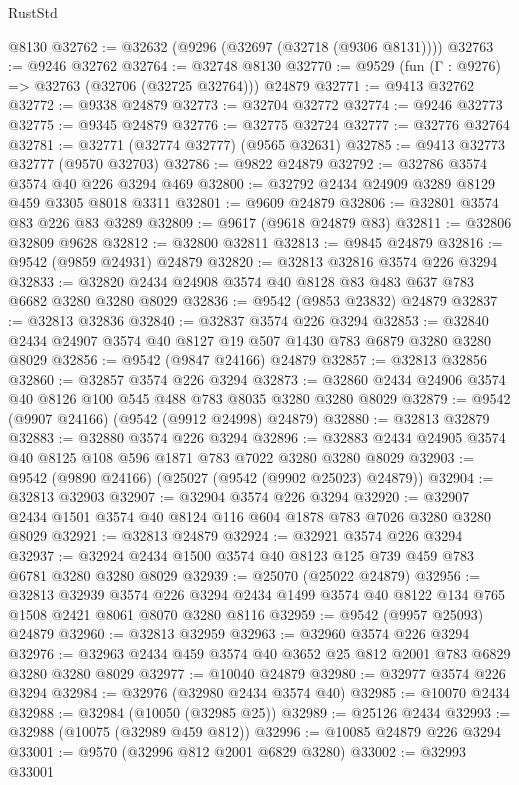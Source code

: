 \begin{lexlean}{RustStd}
\begin{coremodule}
    @8130
@32762 := @32632 (@9296 (@32697 (@32718 (@9306 @8131))))
@32763 := @9246 @32762
@32764 := @32748 @8130
@32770 := @9529 (fun (Γ : @9276) => @32763 (@32706 (@32725 @32764))) @24879
@32771 := @9413 @32762
@32772 := @9338 @24879
@32773 := @32704 @32772
@32774 := @9246 @32773
@32775 := @9345 @24879
@32776 := @32775 @32724
@32777 := @32776 @32764
@32781 := @32771 (@32774 @32777) (@9565 @32631)
@32785 := @9413 @32773 @32777 (@9570 @32703)
@32786 := @9822 @24879
@32792 := @32786 @3574 @3574 @40 @226 @3294 @469
@32800 := @32792 @2434 @24909 @3289 @8129 @459 @3305 @8018 @3311
@32801 := @9609 @24879
@32806 := @32801 @3574 @83 @226 @83 @3289
@32809 := @9617 (@9618 @24879 @83)
@32811 := @32806 @32809 @9628
@32812 := @32800 @32811
@32813 := @9845 @24879
@32816 := @9542 (@9859 @24931) @24879
@32820 := @32813 @32816 @3574 @226 @3294
@32833 := @32820 @2434 @24908 @3574 @40 @8128 @83 @483 @637 @783 @6682 @3280 @3280 @8029
@32836 := @9542 (@9853 @23832) @24879
@32837 := @32813 @32836
@32840 := @32837 @3574 @226 @3294
@32853 := @32840 @2434 @24907 @3574 @40 @8127 @19 @507 @1430 @783 @6879 @3280 @3280 @8029
@32856 := @9542 (@9847 @24166) @24879
@32857 := @32813 @32856
@32860 := @32857 @3574 @226 @3294
@32873 := @32860 @2434 @24906 @3574 @40 @8126 @100 @545 @488 @783 @8035 @3280 @3280 @8029
@32879 := @9542 (@9907 @24166) (@9542 (@9912 @24998) @24879)
@32880 := @32813 @32879
@32883 := @32880 @3574 @226 @3294
@32896 := @32883 @2434 @24905 @3574 @40 @8125 @108 @596 @1871 @783 @7022 @3280 @3280 @8029
@32903 := @9542 (@9890 @24166) (@25027 (@9542 (@9902 @25023) @24879))
@32904 := @32813 @32903
@32907 := @32904 @3574 @226 @3294
@32920 := @32907 @2434 @1501 @3574 @40 @8124 @116 @604 @1878 @783 @7026 @3280 @3280 @8029
@32921 := @32813 @24879
@32924 := @32921 @3574 @226 @3294
@32937 := @32924 @2434 @1500 @3574 @40 @8123 @125 @739 @459 @783 @6781 @3280 @3280 @8029
@32939 := @25070 (@25022 @24879)
@32956 := @32813
    @32939
    @3574
    @226
    @3294
    @2434
    @1499
    @3574
    @40
    @8122
    @134
    @765
    @1508
    @2421
    @8061
    @8070
    @3280
    @8116
@32959 := @9542 (@9957 @25093) @24879
@32960 := @32813 @32959
@32963 := @32960 @3574 @226 @3294
@32976 := @32963 @2434 @459 @3574 @40 @3652 @25 @812 @2001 @783 @6829 @3280 @3280 @8029
@32977 := @10040 @24879
@32980 := @32977 @3574 @226 @3294
@32984 := @32976 (@32980 @2434 @3574 @40)
@32985 := @10070 @2434
@32988 := @32984 (@10050 (@32985 @25))
@32989 := @25126 @2434
@32993 := @32988 (@10075 (@32989 @459 @812))
@32996 := @10085 @24879 @226 @3294
@33001 := @9570 (@32996 @812 @2001 @6829 @3280)
@33002 := @32993 @33001

\end{coremodule}
\end{lexlean}
